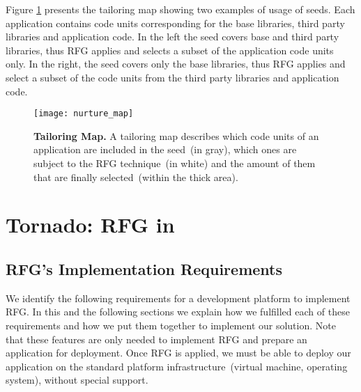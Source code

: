 Figure \ref{fig:nurturing_map_model} presents the tailoring map showing two examples of usage of seeds. Each application contains code units corresponding for the base libraries, third party libraries and application code. In the left the seed covers base and third party libraries, thus RFG applies and selects a subset of the application code units only. In the right, the seed covers only the base libraries, thus RFG applies and select a subset of the code units from the third party libraries and application code.

\begin{figure}[ht]
\begin{center}
\texttt{[image: nurture\_map]}
\caption{\small\textbf{Tailoring Map.} A tailoring map describes which code units of an application are included in the seed~(in gray), which ones are subject to the RFG technique~(in white) and the amount of them that are finally selected~(within the thick area).
\label{fig:nurturing_map_model}}
\end{center}
\end{figure}


\section{Tornado: RFG in \Vtt} \label{sec:implementation}

\subsection{RFG's Implementation Requirements}\label{sec:requirements}

We identify the following requirements for a development platform to implement RFG.
In this and the following sections we explain how we fulfilled each of these requirements and how we put them together to implement our solution. Note that these features are only needed to implement RFG and prepare an application for deployment. Once RFG is applied, we must be able to deploy our application on the standard platform infrastructure~(virtual machine, operating system), without special support.

